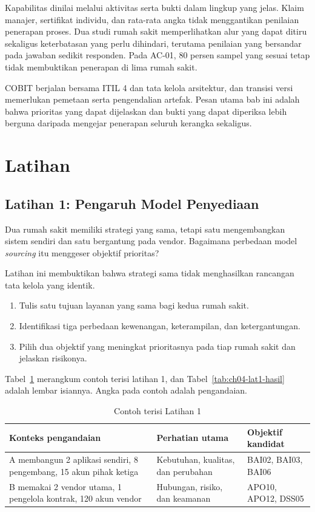 Kapabilitas dinilai melalui aktivitas serta bukti dalam lingkup yang jelas. Klaim manajer, sertifikat individu, dan rata-rata angka tidak menggantikan penilaian penerapan proses. Dua studi rumah sakit memperlihatkan alur yang
dapat ditiru sekaligus keterbatasan yang perlu dihindari, terutama penilaian yang bersandar pada jawaban sedikit responden. Pada AC-01, 80 persen sampel yang sesuai tetap tidak membuktikan penerapan di lima rumah sakit.

COBIT berjalan bersama ITIL 4 dan tata kelola arsitektur, dan transisi versi memerlukan pemetaan serta pengendalian artefak. Pesan utama bab ini adalah bahwa prioritas yang dapat dijelaskan dan bukti yang dapat diperiksa lebih
berguna daripada mengejar penerapan seluruh kerangka sekaligus.

\section{Latihan}

\subsection*{Latihan 1: Pengaruh Model Penyediaan}

Dua rumah sakit memiliki strategi yang sama, tetapi satu mengembangkan sistem sendiri dan satu bergantung pada vendor. Bagaimana perbedaan model \textit{sourcing} itu menggeser objektif prioritas?

Latihan ini membuktikan bahwa strategi sama tidak menghasilkan rancangan tata kelola yang identik.
\begin{enumerate}
  \item Tulis satu tujuan layanan yang sama bagi kedua rumah sakit.
  \item Identifikasi tiga perbedaan kewenangan, keterampilan, dan ketergantungan.
  \item Pilih dua objektif yang meningkat prioritasnya pada tiap rumah sakit dan jelaskan risikonya.
\end{enumerate}

Tabel~\ref{tab:ch04-lat1-contoh} merangkum contoh terisi latihan 1, dan Tabel~\ref{tab:ch04-lat1-hasil} adalah lembar isiannya. Angka pada contoh adalah pengandaian.

\begin{table}[!htb]
  \centering\small
  \caption{Contoh terisi Latihan 1}\label{tab:ch04-lat1-contoh}
  \begin{tabularx}{\textwidth}{|>{\raggedright\arraybackslash}p{}|>{\raggedright\arraybackslash}X|>{\raggedright\arraybackslash}p{}|}
    \hline
    \textbf{Konteks pengandaian} & \textbf{Perhatian utama} & \textbf{Objektif kandidat} \\ \hline
    A membangun 2 aplikasi sendiri, 8 pengembang, 15 akun pihak ketiga & Kebutuhan, kualitas, dan perubahan & BAI02, BAI03, BAI06 \\ \hline
    B memakai 2 vendor utama, 1 pengelola kontrak, 120 akun vendor & Hubungan, risiko, dan keamanan & APO10, APO12, DSS05 \\ \hline
  \end{tabularx}
\end{table}

